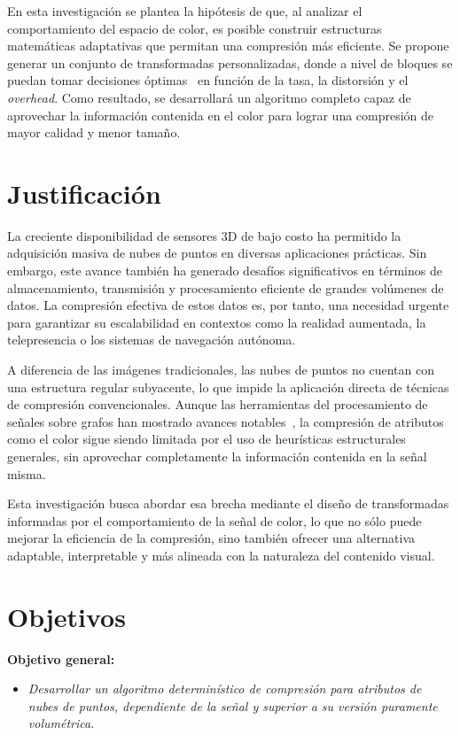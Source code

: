 En esta investigación se plantea la hipótesis de que, al analizar el comportamiento del espacio de color, es posible construir estructuras matemáticas adaptativas que permitan una compresión más eficiente. Se propone generar un conjunto de transformadas personalizadas, donde a nivel de bloques se puedan tomar decisiones óptimas~ en función de la tasa, la distorsión y el \textit{overhead}. Como resultado, se desarrollará un algoritmo completo capaz de aprovechar la información contenida en el color para lograr una compresión de mayor calidad y menor tamaño.

\section{Justificación}

La creciente disponibilidad de sensores 3D de bajo costo ha permitido la adquisición masiva de nubes de puntos en diversas aplicaciones prácticas. Sin embargo, este avance también ha generado desafíos significativos en términos de almacenamiento, transmisión y procesamiento eficiente de grandes volúmenes de datos. La compresión efectiva de estos datos es, por tanto, una necesidad urgente para garantizar su escalabilidad en contextos como la realidad aumentada, la telepresencia o los sistemas de navegación autónoma.

A diferencia de las imágenes tradicionales, las nubes de puntos no cuentan con una estructura regular subyacente, lo que impide la aplicación directa de técnicas de compresión convencionales. Aunque las herramientas del procesamiento de señales sobre grafos han mostrado avances notables~, la compresión de atributos como el color sigue siendo limitada por el uso de heurísticas estructurales generales, sin aprovechar completamente la información contenida en la señal misma.

Esta investigación busca abordar esa brecha mediante el diseño de transformadas informadas por el comportamiento de la señal de color, lo que no sólo puede mejorar la eficiencia de la compresión, sino también ofrecer una alternativa adaptable, interpretable y más alineada con la naturaleza del contenido visual.

\section{Objetivos}

\textbf{Objetivo general:}

\begin{itemize}
    \item \textit{Desarrollar un algoritmo determinístico de compresión para atributos de nubes de puntos, dependiente de la señal y superior a su versión puramente volumétrica.}
\end{itemize}

